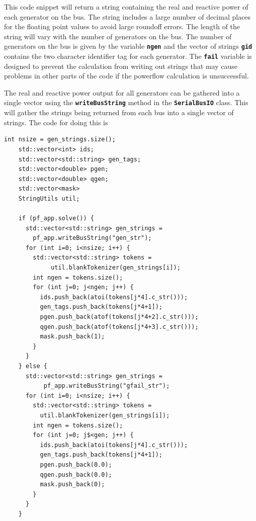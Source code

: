 This code snippet will return a string containing the real and reactive power of each generator on the bus. The string includes a large number of decimal places for the floating point values to avoid large roundoff errors. The length of the string will vary with the number of generators on the bus. The number of generators on the bus is given by the variable \texttt{\textbf{ngen}} and the vector of strings \texttt{\textbf{gid}} contains the two character identifier tag for each generator. The \texttt{\textbf{fail}} variable is designed to prevent the calculation from writing out strings that may cause problems in other parts of the code if the powerflow calculation is unsuccessful.

The real and reactive power output for all generators can be gathered into a single vector using the \texttt{\textbf{writeBusString}} method in the \texttt{\textbf{SerialBusIO}} class. This will gather the strings being returned from each bus into a single vector of strings. The code for doing this is

{
\color{red}
\begin{Verbatim}[fontseries=b]
    int nsize = gen_strings.size();
    std::vector<int> ids;
    std::vector<std::string> gen_tags;
    std::vector<double> pgen;
    std::vector<double> qgen;
    std::vector<mask>
    StringUtils util;

    if (pf_app.solve()) {
      std::vector<std::string> gen_strings =
        pf_app.writeBusString("gen_str");
      for (int i=0; i<nsize; i++) {
        std::vector<std::string> tokens =
             util.blankTokenizer(gen_strings[i]);
        int ngen = tokens.size();
        for (int j=0; j<ngen; j++) {
          ids.push_back(atoi(tokens[j*4].c_str()));
          gen_tags.push_back(tokens[j*4+1]);
          pgen.push_back(atof(tokens[j*4+2].c_str()));
          qgen.push_back(atof(tokens[j*4+3].c_str()));
          mask.push_back(1);
        }
      }
    } else {
      std::vector<std::string> gen_strings =
           pf_app.writeBusString("gfail_str");
      for (int i=0; i<nsize; i++) {
        std::vector<std::string> tokens =
          util.blankTokenizer(gen_strings[i]);
        int ngen = tokens.size();
        for (int j=0; j$<gen; j++) {
          ids.push_back(atoi(tokens[j*4].c_str()));
          gen_tags.push_back(tokens[j*4+1]);
          pgen.push_back(0.0);
          qgen.push_back(0.0);
          mask.push_back(0);
        }
      }
    }
\end{Verbatim}
}

